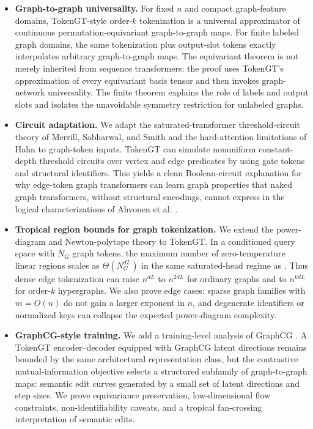 \documentclass[11pt]{article}
\begin{document}
\begin{itemize}
  \item \textbf{Graph-to-graph universality.}  For fixed $n$ and compact graph-feature domains, TokenGT-style order-$k$ tokenization is a universal approximator of continuous permutation-equivariant graph-to-graph maps.  For finite labeled graph domains, the same tokenization plus output-slot tokens exactly interpolates arbitrary graph-to-graph maps.  The equivariant theorem is not merely inherited from sequence transformers: the proof uses TokenGT's approximation of every equivariant basis tensor and then invokes graph-network universality.  The finite theorem explains the role of labels and output slots and isolates the unavoidable symmetry restriction for unlabeled graphs.

  \item \textbf{Circuit adaptation.}  We adapt the saturated-transformer threshold-circuit theory of Merrill, Sabharwal, and Smith \cite{merrill2022saturated} and the hard-attention limitations of Hahn \cite{hahn2020limitations} to graph-token inputs.  TokenGT can simulate nonuniform constant-depth threshold circuits over vertex and edge predicates by using gate tokens and structural identifiers.  This yields a clean Boolean-circuit explanation for why edge-token graph transformers can learn graph properties that naked graph transformers, without structural encodings, cannot express in the logical characterizations of Ahvonen et al. \cite{ahvonen2026logic}.

  \item \textbf{Tropical region bounds for graph tokenization.}  We extend the power-diagram and Newton-polytope theory to TokenGT.  In a conditioned query space with $N_G$ graph tokens, the maximum number of zero-temperature linear regions scales as $\Theta(N_G^{dL})$ in the same saturated-head regime as \cite{su2026tropicalexpressivity}.  Thus dense edge tokenization can raise $n^{dL}$ to $n^{2dL}$ for ordinary graphs and to $n^{kdL}$ for order-$k$ hypergraphs.  We also prove edge cases: sparse graph families with $m=O(n)$ do not gain a larger exponent in $n$, and degenerate identifiers or normalized keys can collapse the expected power-diagram complexity.

  \item \textbf{GraphCG-style training.}  We add a training-level analysis of GraphCG \cite{liu2024graphcg}.  A TokenGT encoder--decoder equipped with GraphCG latent directions remains bounded by the same architectural representation class, but the contrastive mutual-information objective selects a structured subfamily of graph-to-graph maps: semantic edit curves generated by a small set of latent directions and step sizes.  We prove equivariance preservation, low-dimensional flow constraints, non-identifiability caveats, and a tropical fan-crossing interpretation of semantic edits.


\end{itemize}
\end{document}
